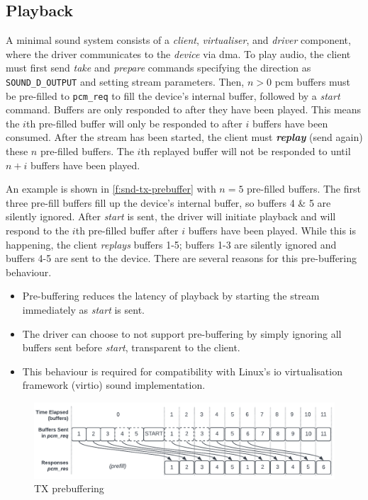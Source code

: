 \documentclass[a4paper,12pt]{report}
\newcommand{\code}[1]{\texttt{#1}}
\begin{document}
\subsection{Playback}

A minimal sound system consists of a \textit{client}, \textit{virtualiser}, and
\textit{driver} component, where the driver communicates to the \textit{device}
via \gls{dma}. To play audio, the client must first send \textit{take} and
\textit{prepare} commands specifying the direction as \code{SOUND\_D\_OUTPUT}
and setting stream parameters. Then, $n>0$ \gls{pcm} buffers must be pre-filled to
\code{pcm\_req} to fill the device's internal buffer, followed by a
\textit{start} command. Buffers are only responded to after they have been
played. This means the $i$th pre-filled buffer will only be responded to after
$i$ buffers have been consumed. After the stream has been started, the client
must \textbf{\textit{replay}} (send again) these $n$ pre-filled buffers. The
$i$th replayed buffer will not be responded to until $n+i$ buffers have been
played.

An example is shown in \autoref{f:snd-tx-prebuffer} with $n=5$ pre-filled
buffers. The first three pre-fill buffers fill up the device's internal buffer,
so buffers 4 \& 5 are silently ignored. After \textit{start} is sent, the driver
will initiate playback and will respond to the $i$th pre-filled buffer after $i$
buffers have been played. While this is happening, the client \textit{replays}
buffers 1-5; buffers 1-3 are silently ignored and buffers 4-5 are sent to the
device. There are several reasons for this pre-buffering behaviour.
\begin{itemize}
  \item Pre-buffering reduces the latency of playback by starting the stream
  immediately as \textit{start} is sent.

  \item The driver can choose to not support pre-buffering by simply ignoring
  all buffers sent before \textit{start}, transparent to the client.

  \item This behaviour is required for compatibility with Linux's \gls{io}
    virtualisation framework (\gls{virtio}) sound
  implementation.
\end{itemize}

\begin{figure}[th]
  \centering
  \includegraphics[width=\textwidth]{snd-tx-prebuffer}
  \caption{TX prebuffering}
  \label{f:snd-tx-prebuffer}
\end{figure}
\end{document}
